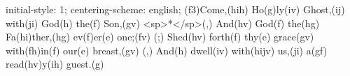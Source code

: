 initial-style: 1;
centering-scheme: english;
(f3)Come,(hih) Ho(g)ly(iv) Ghost,(ij) with(ji) God(h) the(f) Son,(gv) <sp>*</sp>(,)
And(hv) God(f) the(hg) Fa(hi)ther,(hg) ev(f)er(e) one;(fv) (;)
Shed(hv) forth(f) thy(e) grace(gv) with(fh)in(f) our(e) breast,(gv) (,)
And(h) dwell(iv) with(hijv) us,(ji) a(gf) read(hv)y(ih) guest.(g)
